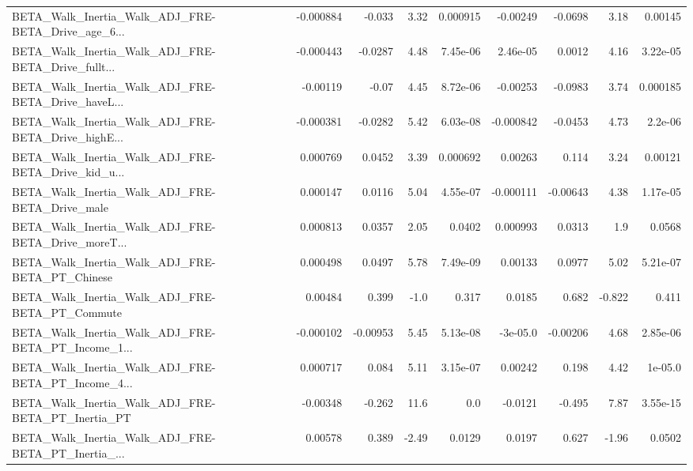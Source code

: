 \begin{tabular}{lrrrrrrrr}
BETA\_Walk\_Inertia\_Walk\_ADJ\_FRE-BETA\_Drive\_age\_6... &   -0.000884 &       -0.033 &     3.32 & 0.000915 &   -0.00249 &     -0.0698 &         3.18 &       0.00145 \\
BETA\_Walk\_Inertia\_Walk\_ADJ\_FRE-BETA\_Drive\_fullt... &   -0.000443 &      -0.0287 &     4.48 & 7.45e-06 &   2.46e-05 &      0.0012 &         4.16 &      3.22e-05 \\
BETA\_Walk\_Inertia\_Walk\_ADJ\_FRE-BETA\_Drive\_haveL... &    -0.00119 &        -0.07 &     4.45 & 8.72e-06 &   -0.00253 &     -0.0983 &         3.74 &      0.000185 \\
BETA\_Walk\_Inertia\_Walk\_ADJ\_FRE-BETA\_Drive\_highE... &   -0.000381 &      -0.0282 &     5.42 & 6.03e-08 &  -0.000842 &     -0.0453 &         4.73 &       2.2e-06 \\
BETA\_Walk\_Inertia\_Walk\_ADJ\_FRE-BETA\_Drive\_kid\_u... &    0.000769 &       0.0452 &     3.39 & 0.000692 &    0.00263 &       0.114 &         3.24 &       0.00121 \\
BETA\_Walk\_Inertia\_Walk\_ADJ\_FRE-BETA\_Drive\_male     &    0.000147 &       0.0116 &     5.04 & 4.55e-07 &  -0.000111 &    -0.00643 &         4.38 &      1.17e-05 \\
BETA\_Walk\_Inertia\_Walk\_ADJ\_FRE-BETA\_Drive\_moreT... &    0.000813 &       0.0357 &     2.05 &   0.0402 &   0.000993 &      0.0313 &          1.9 &        0.0568 \\
BETA\_Walk\_Inertia\_Walk\_ADJ\_FRE-BETA\_PT\_Chinese     &    0.000498 &       0.0497 &     5.78 & 7.49e-09 &    0.00133 &      0.0977 &         5.02 &      5.21e-07 \\
BETA\_Walk\_Inertia\_Walk\_ADJ\_FRE-BETA\_PT\_Commute     &     0.00484 &        0.399 &     -1.0 &    0.317 &     0.0185 &       0.682 &       -0.822 &         0.411 \\
BETA\_Walk\_Inertia\_Walk\_ADJ\_FRE-BETA\_PT\_Income\_1... &   -0.000102 &     -0.00953 &     5.45 & 5.13e-08 &   -3e-05.0 &    -0.00206 &         4.68 &      2.85e-06 \\
BETA\_Walk\_Inertia\_Walk\_ADJ\_FRE-BETA\_PT\_Income\_4... &    0.000717 &        0.084 &     5.11 & 3.15e-07 &    0.00242 &       0.198 &         4.42 &       1e-05.0 \\
BETA\_Walk\_Inertia\_Walk\_ADJ\_FRE-BETA\_PT\_Inertia\_PT  &    -0.00348 &       -0.262 &     11.6 &      0.0 &    -0.0121 &      -0.495 &         7.87 &      3.55e-15 \\
BETA\_Walk\_Inertia\_Walk\_ADJ\_FRE-BETA\_PT\_Inertia\_... &     0.00578 &        0.389 &    -2.49 &   0.0129 &     0.0197 &       0.627 &        -1.96 &        0.0502 \\

\end{tabular}
